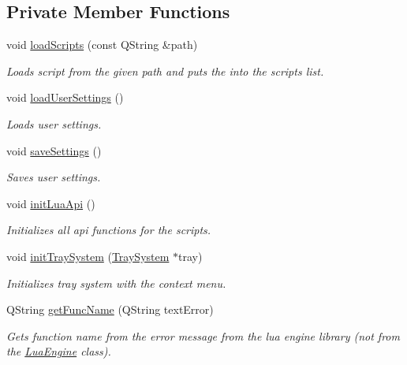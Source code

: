 \subsection*{Private Member Functions}
\begin{DoxyCompactItemize}
\item 
void \hyperlink{classmain_win_a3a1257aa1b06a426b08763a72756f06a}{load\-Scripts} (const Q\-String \&path)
\begin{DoxyCompactList}\small\item\em Loads script from the given path and puts the into the scripts list. \end{DoxyCompactList}\item 
void \hyperlink{classmain_win_ad4278ab4c228ac83a39d5c39f58263c9}{load\-User\-Settings} ()
\begin{DoxyCompactList}\small\item\em Loads user settings. \end{DoxyCompactList}\item 
void \hyperlink{classmain_win_a1c8c39280d85939c865ea28d9afc7960}{save\-Settings} ()
\begin{DoxyCompactList}\small\item\em Saves user settings. \end{DoxyCompactList}\item 
void \hyperlink{classmain_win_a9c0cfda2b24fa6259874caf7ccd4b908}{init\-Lua\-Api} ()
\begin{DoxyCompactList}\small\item\em Initializes all api functions for the scripts. \end{DoxyCompactList}\item 
void \hyperlink{classmain_win_aaf15be9a17be251351b2bde08dcb2c21}{init\-Tray\-System} (\hyperlink{class_tray_system}{Tray\-System} $\ast$tray)
\begin{DoxyCompactList}\small\item\em Initializes tray system with the context menu. \end{DoxyCompactList}\item 
Q\-String \hyperlink{classmain_win_ab00961de109eaf86fceed0dc39d53fe8}{get\-Func\-Name} (Q\-String text\-Error)
\begin{DoxyCompactList}\small\item\em Gets function name from the error message from the lua engine library (not from the \hyperlink{class_lua_engine}{Lua\-Engine} class). \end{DoxyCompactList}\item 

\end{DoxyCompactItemize}
